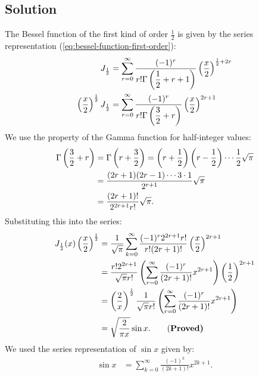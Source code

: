 \begin{enumerate}
\section*{Solution}
The Bessel function of the first kind of order $\displaystyle \frac{1}{2}$ is given by the series representation (\ref{eq:bessel-function-first-order}):
\begin{align}
    J_{\frac{1}{2}}&=\sum_{r=0}^\infty\frac{(-1)^r}{\displaystyle r!\Gamma\left(\frac{1}{2}+r+1\right)}\left(\frac{x}{2}\right)^{\frac{1}{2}+2r}\notag\\
    \left(\frac{x}{2}\right)^\frac{1}{2}J_{\frac{1}{2}}&=\sum_{r=0}^\infty\frac{(-1)^r}{\displaystyle r!\Gamma\left(\frac{3}{2}+r\right)}\left(\frac{x}{2}\right)^{2r+1}
\end{align}
We use the property of the Gamma function for half-integer values:
\begin{align}
    \Gamma\left(\frac{3}{2} + r\right) &= \Gamma\left(r + \frac{3}{2}\right) = \left(r+\dfrac12\right)\left(r-\dfrac12\right) \cdots \dfrac12 \sqrt{\pi} \notag\\
    &= \dfrac{(2r+1)(2r-1)\cdots 3 \cdot 1}{2^{r+1}} \sqrt{\pi}\notag\\
    &= \dfrac{(2r+1)!}{2^{2r+1}r!} \sqrt{\pi}.
\end{align}
Substituting this into the series:
\begin{align}
    J_{\frac{1}{2}}(x)\left(\frac{x}{2}\right)^{\frac{1}{2}} &= \frac{1}{\sqrt{\pi}}\sum_{k=0}^{\infty} \frac{(-1)^r 2^{2r+1}r!}{r!(2r + 1)!} \left(\frac{x}{2}\right)^{2r+1}\notag\\
    &=\frac{r!2^{2r+1}}{\sqrt{\pi}r!}\left(\sum_{r=0}^{\infty} \frac{(-1)^r}{(2r+1)!} x^{2r+1}\right)\left(\frac{1}{2}\right)^{{2r+1}}\notag\\
    &=\left(\frac{2}{x}\right)^{\frac{1}{2}}\frac{1}{\sqrt{\pi}r!}\left(\sum_{r=0}^{\infty} \frac{(-1)^r}{(2r+1)!} x^{2r+1}\right)\notag\\
    &=\sqrt{\frac{2}{\pi x}} \sin x.\qquad\text{(\bf Proved)}
\end{align}
We used the series representation of $\displaystyle \sin x$ given by:
\begin{align*}
    \sin x &= \sum_{k=0}^{\infty} \frac{(-1)^k}{(2k+1)!} x^{2k+1}.
\end{align*}
\end{enumerate}